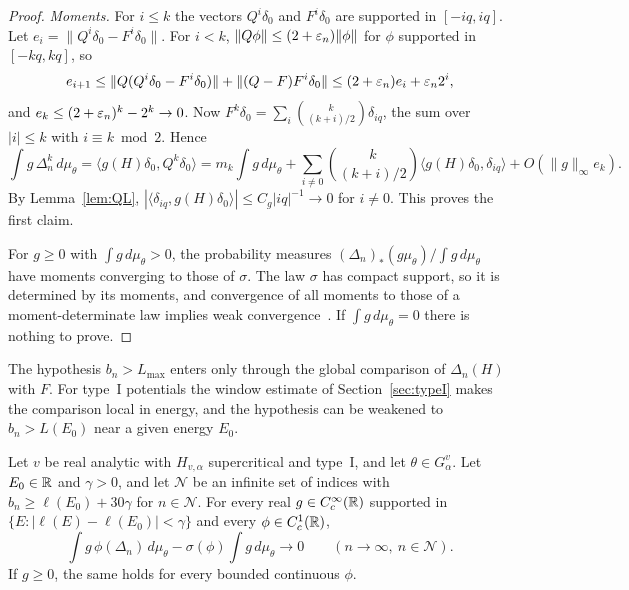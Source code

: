 \begin{proof}
\emph{Moments.} For $i\le k$ the vectors $Q^i\delta_0$ and $F^i\delta_0$ are supported in $[-iq,iq]$. Let $e_i=\|Q^i\delta_0-F^i\delta_0\|$. For $i<k$, $\|Q\phi\|\le(2+\varepsilon_n)\|\phi\|$ for $\phi$ supported in $[-kq,kq]$, so
\[
e_{i+1}\le\|Q(Q^i\delta_0-F^i\delta_0)\|+\|(Q-F)F^i\delta_0\|\le(2+\varepsilon_n)e_i+\varepsilon_n2^i,
\]
and $e_k\le(2+\varepsilon_n)^k-2^k\to0$. Now $F^k\delta_0=\sum_i\binom{k}{(k+i)/2}\delta_{iq}$, the sum over $|i|\le k$ with $i\equiv k\bmod 2$. Hence
\[
\int g\,\Delta_n^k\,d\mu_\theta=\langle g(H)\delta_0,Q^k\delta_0\rangle=m_k\int g\,d\mu_\theta+\sum_{i\ne0}\binom{k}{(k+i)/2}\langle g(H)\delta_0,\delta_{iq}\rangle+O(\|g\|_\infty e_k).
\]
By Lemma~\ref{lem:QL}, $|\langle\delta_{iq},g(H)\delta_0\rangle|\le C_g|iq|^{-1}\to0$ for $i\ne0$. This proves the first claim.

For $g\ge0$ with $\int g\,d\mu_\theta>0$, the probability measures $(\Delta_n)_*(g\mu_\theta)/\int g\,d\mu_\theta$ have moments converging to those of $\sigma$. The law $\sigma$ has compact support, so it is determined by its moments, and convergence of all moments to those of a moment-determinate law implies weak convergence~\cite[Theorems~30.1 and~30.2]{Billingsley1995}. If $\int g\,d\mu_\theta=0$ there is nothing to prove.
\end{proof}

The hypothesis $b_n>L_{\max}$ enters only through the global comparison of $\Delta_n(H)$ with $F$. For type~I potentials the window estimate of Section~\ref{sec:typeI} makes the comparison local in energy, and the hypothesis can be weakened to $b_n>L(E_0)$ near a given energy $E_0$.

\begin{lemma}\label{lem:arcsineloc}
Let $v$ be real analytic with $H_{v,\alpha}$ supercritical and type~I, and let $\theta\in G^v_\alpha$. Let $E_0\in\mathbb R$ and $\gamma>0$, and let $\mathcal N$ be an infinite set of indices with $b_n\ge\ell(E_0)+30\gamma$ for $n\in\mathcal N$. For every real $g\in C_c^\infty(\mathbb R)$ supported in $\{E:|\ell(E)-\ell(E_0)|<\gamma\}$ and every $\phi\in C_c^1(\mathbb R)$,
\[
\int g\,\phi(\Delta_n)\,d\mu_\theta-\sigma(\phi)\int g\,d\mu_\theta\to0\qquad(n\to\infty,\ n\in\mathcal N).
\]
If $g\ge0$, the same holds for every bounded continuous $\phi$.
\end{lemma}

